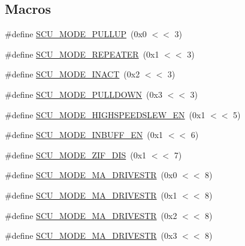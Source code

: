 \subsection*{Macros}
\begin{DoxyCompactItemize}
\item 
\#define \hyperlink{group___s_c_u__18_x_x__43_x_x_gae75af2f0fdc362837d997ad5613d4a59}{S\+C\+U\+\_\+\+M\+O\+D\+E\+\_\+\+P\+U\+L\+L\+UP}~(0x0 $<$$<$ 3)
\item 
\#define \hyperlink{group___s_c_u__18_x_x__43_x_x_gac20d21e00fdd121d25725066cd02c41f}{S\+C\+U\+\_\+\+M\+O\+D\+E\+\_\+\+R\+E\+P\+E\+A\+T\+ER}~(0x1 $<$$<$ 3)
\item 
\#define \hyperlink{group___s_c_u__18_x_x__43_x_x_ga9e19fc80ad4c70d25069566be9dccf53}{S\+C\+U\+\_\+\+M\+O\+D\+E\+\_\+\+I\+N\+A\+CT}~(0x2 $<$$<$ 3)
\item 
\#define \hyperlink{group___s_c_u__18_x_x__43_x_x_gad9c9eb3ee857ec8d0917d257db190e79}{S\+C\+U\+\_\+\+M\+O\+D\+E\+\_\+\+P\+U\+L\+L\+D\+O\+WN}~(0x3 $<$$<$ 3)
\item 
\#define \hyperlink{group___s_c_u__18_x_x__43_x_x_gaae9b7437fda7df4f7e0266d62df1ead1}{S\+C\+U\+\_\+\+M\+O\+D\+E\+\_\+\+H\+I\+G\+H\+S\+P\+E\+E\+D\+S\+L\+E\+W\+\_\+\+EN}~(0x1 $<$$<$ 5)
\item 
\#define \hyperlink{group___s_c_u__18_x_x__43_x_x_ga66123729d389bc3191481392d4063290}{S\+C\+U\+\_\+\+M\+O\+D\+E\+\_\+\+I\+N\+B\+U\+F\+F\+\_\+\+EN}~(0x1 $<$$<$ 6)
\item 
\#define \hyperlink{group___s_c_u__18_x_x__43_x_x_ga240a8e7d216587a3dcb1989274cb73a8}{S\+C\+U\+\_\+\+M\+O\+D\+E\+\_\+\+Z\+I\+F\+\_\+\+D\+IS}~(0x1 $<$$<$ 7)
\item 
\#define \hyperlink{group___s_c_u__18_x_x__43_x_x_gafc1e75b357677ff26cef511c0db63024}{S\+C\+U\+\_\+\+M\+O\+D\+E\+\_\+M\+A\+\_\+\+D\+R\+I\+V\+E\+S\+TR}~(0x0 $<$$<$ 8)
\item 
\#define \hyperlink{group___s_c_u__18_x_x__43_x_x_gad8cd05fe91f6618f288a6a44a04b0f54}{S\+C\+U\+\_\+\+M\+O\+D\+E\+\_\+M\+A\+\_\+\+D\+R\+I\+V\+E\+S\+TR}~(0x1 $<$$<$ 8)
\item 
\#define \hyperlink{group___s_c_u__18_x_x__43_x_x_gadf7d955c410140acacca5c0223420f59}{S\+C\+U\+\_\+\+M\+O\+D\+E\+\_\+M\+A\+\_\+\+D\+R\+I\+V\+E\+S\+TR}~(0x2 $<$$<$ 8)
\item 
\#define \hyperlink{group___s_c_u__18_x_x__43_x_x_ga6d08e27351b19971ac5d8dcd3a73f635}{S\+C\+U\+\_\+\+M\+O\+D\+E\+\_\+M\+A\+\_\+\+D\+R\+I\+V\+E\+S\+TR}~(0x3 $<$$<$ 8)
\item 
$$
\end{DoxyCompactItemize}
